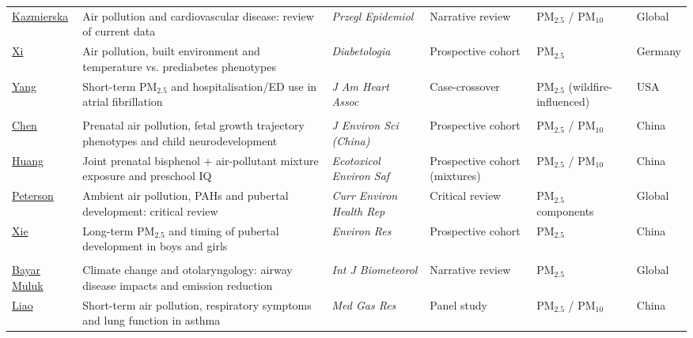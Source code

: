 {\begin{longtable}{@{}>{\RaggedRight}p{25mm}>{\RaggedRight}p{41mm}>{\RaggedRight}p{27mm}%
>{\RaggedRight}p{23mm}>{\RaggedRight}p{18mm}>{\RaggedRight}p{15mm}@{}}
\href{https://doi.org/10.32394/pe/218966}{Kazmierska} & Air pollution and cardiovascular disease: review of current data & \textit{Przegl Epidemiol} & Narrative review & PM$_{2.5}$ / PM$_{10}$ & Global\\
\href{https://doi.org/10.1007/s00125-026-06814-2}{Xi} & Air pollution, built environment and temperature vs. prediabetes phenotypes & \textit{Diabetologia} & Prospective cohort & PM$_{2.5}$ & Germany\\
\href{https://doi.org/10.1161/JAHA.125.046917}{Yang} & Short-term PM$_{2.5}$ and hospitalisation/ED use in atrial fibrillation & \textit{J Am Heart Assoc} & Case-crossover & PM$_{2.5}$ (wildfire-influenced) & USA\\
\addlinespace[0.9mm]
\multicolumn{6}{@{}l@{}}{\cellcolor{Mist}\textsf{\textbf{\textcolor{Sky}{Reproductive \& developmental}}}}\\[0.6mm]
\href{https://doi.org/10.1016/j.jes.2025.10.043}{Chen} & Prenatal air pollution, fetal growth trajectory phenotypes and child neurodevelopment & \textit{J Environ Sci (China)} & Prospective cohort & PM$_{2.5}$ / PM$_{10}$ & China\\
\href{https://doi.org/10.1016/j.ecoenv.2026.120566}{Huang} & Joint prenatal bisphenol + air-pollutant mixture exposure and preschool IQ & \textit{Ecotoxicol Environ Saf} & Prospective cohort (mixtures) & PM$_{2.5}$ / PM$_{10}$ & China\\
\href{https://doi.org/10.1007/s40572-026-00552-8}{Peterson} & Ambient air pollution, PAHs and pubertal development: critical review & \textit{Curr Environ Health Rep} & Critical review & PM$_{2.5}$ components & Global\\
\href{https://doi.org/10.1016/j.envres.2026.125313}{Xie} & Long-term PM$_{2.5}$ and timing of pubertal development in boys and girls & \textit{Environ Res} & Prospective cohort & PM$_{2.5}$ & China\\
\addlinespace[0.9mm]
\multicolumn{6}{@{}l@{}}{\cellcolor{Mist}\textsf{\textbf{\textcolor{Sage}{Respiratory \& allergic}}}}\\[0.6mm]
\href{https://doi.org/10.1007/s00484-026-03289-z}{Bayar Muluk} & Climate change and otolaryngology: airway disease impacts and emission reduction & \textit{Int J Biometeorol} & Narrative review & PM$_{2.5}$ & Global\\
\href{https://doi.org/10.4103/mgr.MEDGASRES-D-25-00164}{Liao} & Short-term air pollution, respiratory symptoms and lung function in asthma & \textit{Med Gas Res} & Panel study & PM$_{2.5}$ / PM$_{10}$ & China\\

\end{longtable}}
